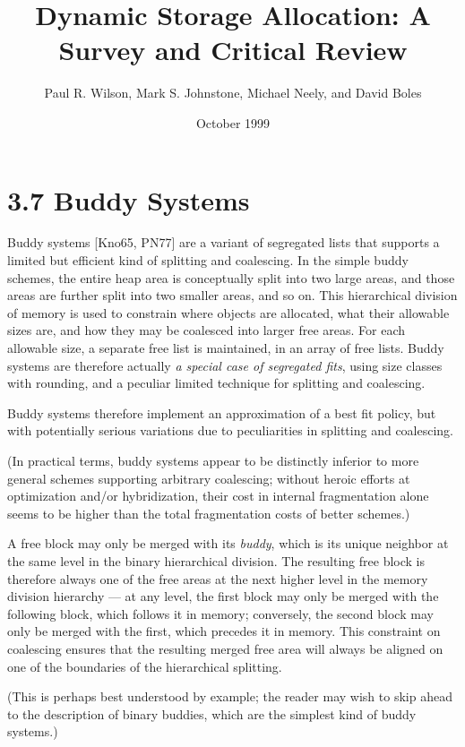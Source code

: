 \documentclass[a4paper,12pt,notitlepage,twoside,openright]{article}
\title{Dynamic Storage Allocation: A Survey and Critical Review}
\author{Paul R. Wilson, Mark S. Johnstone, Michael Neely, and David Boles}
\date{October 1999}
\begin{document}
\maketitle{}

\section*{3.7 Buddy Systems}

Buddy systems [Kno65, PN77] are a variant of segregated lists that supports
a limited but efficient kind of splitting and coalescing. In the simple buddy
schemes, the entire heap area is conceptually split into two large areas, and
those areas are further split into two smaller areas, and so on. This hierarchical
division of memory is used to constrain where objects are allocated, what their
allowable sizes are, and how they may be coalesced into larger free areas. For each
allowable size, a separate free list is maintained, in an array of free lists. Buddy
systems are therefore actually \emph{a special case of segregated fits}, using size classes
with rounding, and a peculiar limited technique for splitting and coalescing.

Buddy systems therefore implement an approximation of a best fit policy, but
with potentially serious variations due to peculiarities in splitting and coalescing.

(In practical terms, buddy systems appear to be distinctly inferior to more
general schemes supporting arbitrary coalescing; without heroic efforts at optimization
and/or hybridization, their cost in internal fragmentation alone seems
to be higher than the total fragmentation costs of better schemes.)

A free block may only be merged with its \emph{buddy}, which is its unique neighbor
at the same level in the binary hierarchical division. The resulting free block is
therefore always one of the free areas at the next higher level in the memory division
hierarchy --- at any level, the first block may only be merged with the
following block, which follows it in memory; conversely, the second block may
only be merged with the first, which precedes it in memory. This constraint on
coalescing ensures that the resulting merged free area will always be aligned on
one of the boundaries of the hierarchical splitting.

(This is perhaps best understood by example; the reader may wish to skip
ahead to the description of binary buddies, which are the simplest kind of buddy
systems.)
\end{document}
